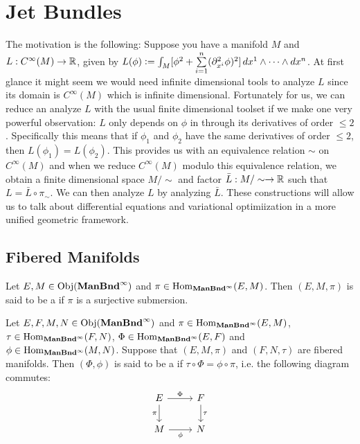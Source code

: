 \documentclass{book}
\begin{document}
\chapter{Jet Bundles}

\begin{note}
	The motivation is the following: Suppose you have a manifold $M$ and $L:C^{\infty}(M) \rightarrow \mathbb{R}$, given by $L(\phi) \vcentcolon= \int_M [\phi^2 + \sum\limits_{i=1}^n (\partial^2_{x^i} \phi)^2] \,d x^1 \wedge \cdots \wedge dx^n$. At first glance it might seem we would need infinite dimensional tools to analyze $L$ since its domain is $C^{\infty}(M)$ which is infinite dimensional. Fortunately for us, we can reduce an analyze $L$ with the usual finite dimensional toolset if we make one very powerful observation: $L$ only depends on $\phi$ in through its derivatives of order $\leq 2$. Specifically this means that if $\phi_1$ and $\phi_2$ have the same derivatives of order $\leq 2$, then $L(\phi_1) = L(\phi_2)$. This provides us with an equivalence relation $\sim$ on $C^{\infty}(M)$ and when we reduce $C^{\infty}(M)$ modulo this equivalence relation, we obtain a finite dimensional space $ M / \sim$ and factor $\bar{L}: M / \sim \rightarrow \mathbb{R}$ such that $L = \bar{L} \circ \pi_{\sim}$. We can then analyze $L$ by analyzing $\bar{L}$. These constructions will allow us to talk about differential equations and variational optimiization in a more unified geometric framework.
\end{note}

\section{Fibered Manifolds}

\begin{defn} 
	Let $E, M \in \operatorname{Obj}(\operatorname*{\text{\textbf{ManBnd}}^{\infty}})$ and $\pi \in \operatorname{Hom}_{\operatorname*{\text{\textbf{ManBnd}}^{\infty}}}(E, M)$. Then $(E, M, \pi)$ is said to be a  if $\pi$ is a surjective submersion. 
\end{defn}

\begin{defn}
	Let $E,F, M, N \in \operatorname{Obj}(\operatorname*{\text{\textbf{ManBnd}}^{\infty}})$ and $\pi \in \operatorname{Hom}_{\operatorname*{\text{\textbf{ManBnd}}^{\infty}}}(E, M)$, $\tau \in \operatorname{Hom}_{\operatorname*{\text{\textbf{ManBnd}}^{\infty}}}(F, N)$, $\Phi \in \operatorname{Hom}_{\operatorname*{\text{\textbf{ManBnd}}^{\infty}}}(E, F)$ and $\phi \in \operatorname{Hom}_{\operatorname*{\text{\textbf{ManBnd}}^{\infty}}}(M, N)$. Suppose that $(E, M, \pi)$ and $(F, N, \tau)$ are fibered manifolds. Then $(\Phi, \phi)$ is said to be a  if $\tau \circ \Phi = \phi \circ \pi$, i.e. the following diagram commutes: \\
	\[ 
	\begin{tikzcd}
		E \arrow[d, "\pi"'] \arrow[r, "\Phi"] & F \arrow[d, "\tau"] \\
		M \arrow[r, "\phi"'] &  N
	\end{tikzcd}
	\] 
\end{defn}
\end{document}

